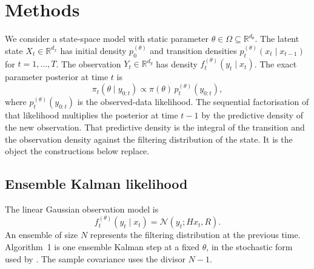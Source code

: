 \section{Methods}
\label{sec:methods}

We consider a state-space model with static parameter \(\theta \in \Omega \subseteq \mathbb{R}^{d_\theta}\). The latent state \(X_t \in \mathbb{R}^{d_x}\) has initial density \(p_0^{(\theta)}\) and transition densities \(p_t^{(\theta)}(x_t \mid x_{t-1})\) for \(t = 1, \ldots, T\). The observation \(Y_t \in \mathbb{R}^{d_y}\) has density \(f_t^{(\theta)}(y_t \mid x_t)\). The exact parameter posterior at time \(t\) is
\begin{equation}
\label{eq:exact}
\pi_t(\theta \mid y_{0:t})
  \propto \pi(\theta)\, p_t^{(\theta)}(y_{0:t}),
\end{equation}
where \(p_t^{(\theta)}(y_{0:t})\) is the observed-data likelihood. The sequential factorisation of that likelihood multiplies the posterior at time \(t-1\) by the predictive density of the new observation. That predictive density is the integral of the transition and the observation density against the filtering distribution of the state. It is the object the constructions below replace.

\subsection{Ensemble Kalman likelihood}
\label{sec:enkf-lik}

The linear Gaussian observation model is
\begin{equation}
\label{eq:obs}
f_t^{(\theta)}(y_t \mid x_t) = \mathcal{N}(y_t; Hx_t, R).
\end{equation}
An ensemble of size \(N\) represents the filtering distribution at the previous time. Algorithm~1 is one ensemble Kalman step at a fixed \(\theta\), in the stochastic form used by \citet[Algorithm~3]{golightly2026}. The sample covariance uses the divisor \(N-1\).

